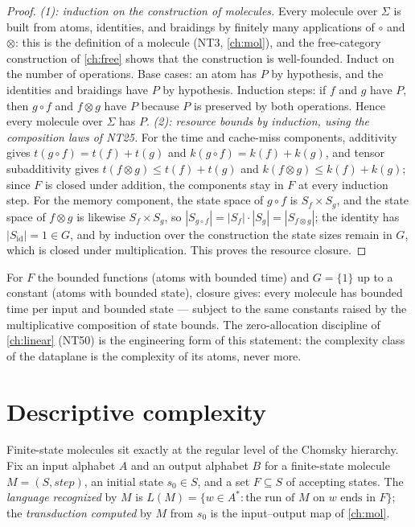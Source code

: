\begin{proof}
\emph{(1): induction on the construction of molecules.} Every molecule over
$\Sigma$ is built from atoms, identities, and braidings by finitely many
applications of $\circ$ and $\otimes$: this is the definition of a molecule
(NT3, \autoref{ch:mol}), and the free-category construction of
\autoref{ch:free} shows that the construction is well-founded. Induct on the
number of operations. Base cases: an atom has $P$ by hypothesis, and the
identities and braidings have $P$ by hypothesis. Induction steps: if $f$ and
$g$ have $P$, then $g \circ f$ and $f \otimes g$ have $P$ because $P$ is
preserved by both operations. Hence every molecule over $\Sigma$ has $P$.
\emph{(2): resource bounds by induction, using the composition laws of NT25.}
For the time and cache-miss components, additivity gives
$t(g \circ f) = t(f) + t(g)$ and $k(g \circ f) = k(f) + k(g)$, and tensor
subadditivity gives $t(f \otimes g) \le t(f) + t(g)$ and
$k(f \otimes g) \le k(f) + k(g)$; since $F$ is closed under addition, the
components stay in $F$ at every induction step. For the memory component, the
state space of $g \circ f$ is $S_f \times S_g$, and the state space of
$f \otimes g$ is likewise $S_f \times S_g$, so
$|S_{g \circ f}| = |S_f| \cdot |S_g| = |S_{f \otimes g}|$; the identity has
$|S_{\mathrm{id}}| = 1 \in G$, and by induction over the construction the
state sizes remain in $G$, which is closed under multiplication. This proves
the resource closure.
\end{proof}

\begin{remark}
For $F$ the bounded functions (atoms with bounded time) and $G = \{1\}$ up to
a constant (atoms with bounded state), closure gives: every molecule has
bounded time per input and bounded state --- subject to the same constants
raised by the multiplicative composition of state bounds. The zero-allocation
discipline of \autoref{ch:linear} (NT50) is the engineering form of this
statement: the complexity class of the dataplane is the complexity of its
atoms, never more.
\end{remark}

\section{Descriptive complexity}\label{sec:enrich-descriptive}

Finite-state molecules sit exactly at the regular level of the Chomsky
hierarchy. Fix an input alphabet $A$ and an output alphabet $B$ for a
finite-state molecule $M = (S, \mathit{step})$, an initial state $s_0 \in S$,
and a set $F \subseteq S$ of accepting states. The \emph{language recognized}
by $M$ is $L(M) = \{w \in A^{*} : \text{the run of } M \text{ on } w \text{ ends
in } F\}$; the \emph{transduction computed} by $M$ from $s_0$ is the
input--output map of \autoref{ch:mol}.

